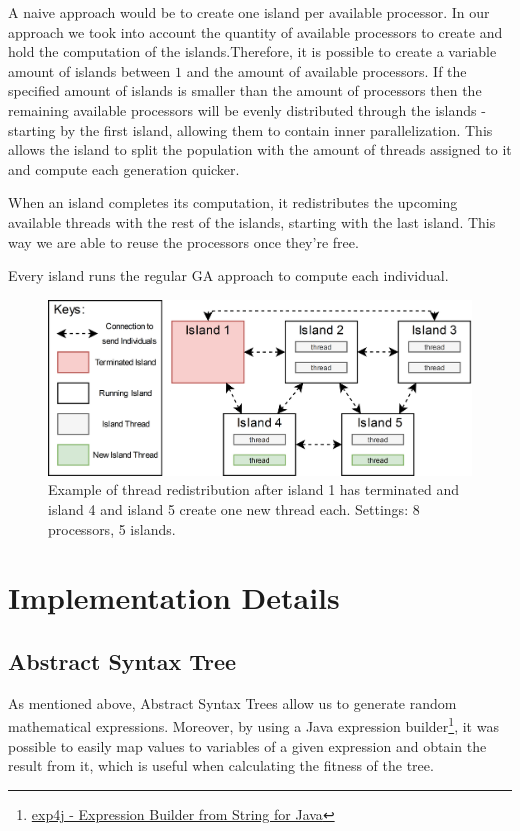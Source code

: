 \documentclass[runningheads]{llncs}
\begin{document}
A naive approach would be to create one island per available processor. In our approach we took into account the quantity of available processors to create and hold the computation of the islands.Therefore, it is possible to create a variable amount of islands between $1$ and the amount of available processors. If the specified amount of islands is smaller than the amount of processors then the remaining available processors will be evenly distributed through the islands - starting by the first island, allowing them to contain inner parallelization. This allows the island to split the population with the amount of threads assigned to it and compute each generation quicker.

When an island completes its computation, it redistributes the upcoming available threads with the rest of the islands, starting with the last island. This way we are able to reuse the processors once they're free.

Every island runs the regular GA approach to compute each individual.

\begin{figure}[htbp]
\centering
\includegraphics[width=.92\textwidth]{IslandModel.png}
\caption{Example of thread redistribution after island 1 has terminated and island 4 and island 5 create one new thread each. Settings: 8 processors, 5 islands.} \label{islandDiagram}
\end{figure}

\section{Implementation Details}

\subsection{Abstract Syntax Tree}

As mentioned above, Abstract Syntax Trees allow us to generate random mathematical expressions. Moreover, by using a Java expression builder\footnote{\href{https://www.objecthunter.net/exp4j/index.htm}{exp4j - Expression Builder from String for Java}}, it was possible to easily map values to variables of a given expression and obtain the result from it, which is useful when calculating the fitness of the tree.
\end{document}

